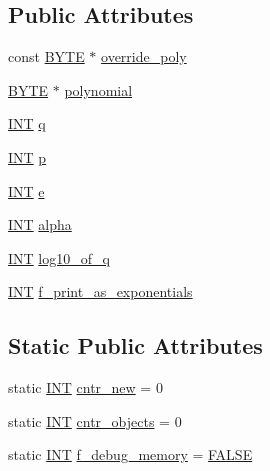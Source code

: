 \subsection*{Public Attributes}
\begin{DoxyCompactItemize}
\item 
const \mbox{\hyperlink{galois_8h_ab6cc7b4aeb6ea31aba2b3fbfc83ff5e6}{B\+Y\+TE}} $\ast$ \mbox{\hyperlink{classfinite__field_a46ab9978c76a731a241223c13a62dfce}{override\+\_\+poly}}
\item 
\mbox{\hyperlink{galois_8h_ab6cc7b4aeb6ea31aba2b3fbfc83ff5e6}{B\+Y\+TE}} $\ast$ \mbox{\hyperlink{classfinite__field_a6f835d2357df34ac28b74276a8773f31}{polynomial}}
\item 
\mbox{\hyperlink{galois_8h_a09fddde158a3a20bd2dcadb609de11dc}{I\+NT}} \mbox{\hyperlink{classfinite__field_a860fdb72f3e11356476cb0841977c21b}{q}}
\item 
\mbox{\hyperlink{galois_8h_a09fddde158a3a20bd2dcadb609de11dc}{I\+NT}} \mbox{\hyperlink{classfinite__field_a6ade6bf60b02c28de9e4b3b7015badb5}{p}}
\item 
\mbox{\hyperlink{galois_8h_a09fddde158a3a20bd2dcadb609de11dc}{I\+NT}} \mbox{\hyperlink{classfinite__field_a1a1e86f11c0c951ed1869fa05071cc16}{e}}
\item 
\mbox{\hyperlink{galois_8h_a09fddde158a3a20bd2dcadb609de11dc}{I\+NT}} \mbox{\hyperlink{classfinite__field_a5fbda70e8d5b9930f276022bd59fcd70}{alpha}}
\item 
\mbox{\hyperlink{galois_8h_a09fddde158a3a20bd2dcadb609de11dc}{I\+NT}} \mbox{\hyperlink{classfinite__field_a653fcdd4c0b149279025f827f71a519b}{log10\+\_\+of\+\_\+q}}
\item 
\mbox{\hyperlink{galois_8h_a09fddde158a3a20bd2dcadb609de11dc}{I\+NT}} \mbox{\hyperlink{classfinite__field_a72c5950fe44e4dc7e8f13aca18bb9373}{f\+\_\+print\+\_\+as\+\_\+exponentials}}
\end{DoxyCompactItemize}
\subsection*{Static Public Attributes}
\begin{DoxyCompactItemize}
\item 
static \mbox{\hyperlink{galois_8h_a09fddde158a3a20bd2dcadb609de11dc}{I\+NT}} \mbox{\hyperlink{classfinite__field_a4e170fbf1130aba4c2a9d40199727083}{cntr\+\_\+new}} = 0
\item 
static \mbox{\hyperlink{galois_8h_a09fddde158a3a20bd2dcadb609de11dc}{I\+NT}} \mbox{\hyperlink{classfinite__field_ab9f30d0cc327faf4e92e406147873b51}{cntr\+\_\+objects}} = 0
\item 
static \mbox{\hyperlink{galois_8h_a09fddde158a3a20bd2dcadb609de11dc}{I\+NT}} \mbox{\hyperlink{classfinite__field_afde4a87090e7618049dc9f563c187713}{f\+\_\+debug\+\_\+memory}} = \mbox{\hyperlink{nauty_8h_aa93f0eb578d23995850d61f7d61c55c1}{F\+A\+L\+SE}}
\end{DoxyCompactItemize}


